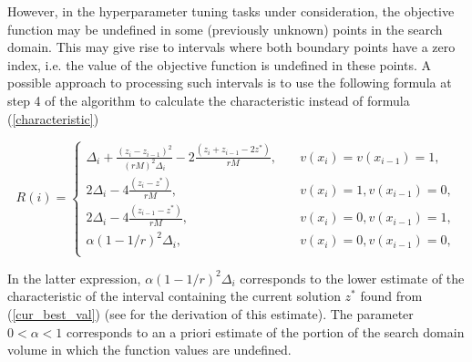 \documentclass[runningheads]{llncs}
\begin{document}
However, in the hyperparameter tuning tasks under consideration, the objective function may be undefined in some (previously unknown) points in the search domain. This may give rise to intervals where both boundary points have a zero index, i.e. the value of the objective function is undefined in these points. A possible approach to processing such intervals is to use the following formula at step 4 of the algorithm to calculate the characteristic instead of formula (\ref{characteristic})

\begin{equation}\label{characteristic_2}
R(i)=
\begin{cases}
    \Delta_i+\frac{(z_i-z_{i-1})^2}{(rM)^2\Delta_i} - 2 \frac{(z_i+z_{i-1}-2z^*)}{rM},   & \quad v(x_i)=v(x_{i-1})=1,\\
    2\Delta_i- 4 \frac{(z_i-z^*)}{rM},   & \quad v(x_i)=1, v(x_{i-1})=0,\\
    2\Delta_i- 4 \frac{(z_{i-1}-z^*)}{rM},       & \quad v(x_i)=0, v(x_{i-1})=1,\\
    \alpha(1-1/r)^2\Delta_i,       & \quad v(x_i)=0, v(x_{i-1})=0,\\
\end{cases}
\end{equation}

In the latter expression, $\alpha(1-1/r)^2\Delta_i$ corresponds to the lower estimate of the characteristic of the interval containing the current solution $z^*$ found from (\ref{cur_best_val}) (see \cite{Strongin2020} for the derivation of this estimate). The parameter $0<\alpha<1$ corresponds to an a priori estimate of the portion of the search domain volume in which the function values are undefined.  
\end{document}
